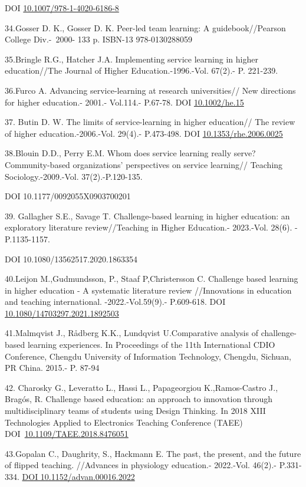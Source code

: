 DOI
\href{http://dx.doi.org/10.1007/978-1-4020-6186-8}{10.1007/978-1-4020-6186-8}

34.Gosser D. K., Gosser D. K. Peer-led team learning: A
guidebook//Pearson College Div.-~2000- 133 p. ISBN-13 ‏ ~978-0130288059

35.Bringle R.G., Hatcher J.A. Implementing service learning in higher
education//The Journal of Higher Education.-1996.-Vol. 67(2).- P.
221-239.

36.Furco A. Advancing service‐learning at research universities// New
directions for higher education.- 2001.- Vol.114.- P.67-78. DOI
\href{http://dx.doi.org/10.1002/he.15}{10.1002/he.15}

37. Butin D. W. The limits of service-learning in higher education// The
review of higher education.-2006.-Vol. 29(4).- P.473-498. DOI
\href{http://dx.doi.org/10.1353/rhe.2006.0025}{10.1353/rhe.2006.0025}

38.Blouin D.D., Perry E.M. Whom does service learning really serve?
Community-based organizations'{} perspectives on service
learning// Teaching Sociology.-2009.-Vol. 37(2).-P.120-135.

DOI 10.1177/0092055X0903700201

39. Gallagher S.E., Savage T. Challenge-based learning in higher
education: an exploratory literature review//Teaching in Higher
Education.- 2023.-Vol. 28(6). - P.1135-1157.

DOI 10.1080/13562517.2020.1863354

40.Leijon M.,Gudmundsson, P., Staaf P,Christersson C. Challenge based
learning in higher education - A systematic literature review
//Innovations in education and teaching international.
-2022.-Vol.59(9).- P.609-618. DOI
\href{http://dx.doi.org/10.1080/14703297.2021.1892503}{10.1080/14703297.2021.1892503}

41.Malmqvist J., Rådberg K.K., Lundqvist U.Comparative analysis of
challenge-based learning experiences. In Proceedings of the 11th
International CDIO Conference, Chengdu University of Information
Technology, Chengdu, Sichuan, PR China. 2015.- P. 87-94

42. Charosky G., Leveratto L., Hassi L., Papageorgiou K.,Ramos-Castro
J., Bragós, R. Challenge based education: an approach to innovation
through multidisciplinary teams of students using Design Thinking. In
2018 XIII Technologies Applied to Electronics Teaching Conference (TAEE)
DOI~\href{https://doi.org/10.1109/TAEE.2018.8476051}{10.1109/TAEE.2018.8476051}

43.Gopalan C., Daughrity, S., Hackmann E. The past, the present, and the
future of flipped teaching. //Advances in physiology education.-
2022.-Vol. 46(2).- P.331-334.
\href{https://doi.org/10.1152/advan.00016.2022}{DOI
10.1152/advan.00016.2022}

